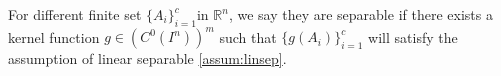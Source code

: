 
\begin{definition}[Separabel]
For different finite set $\{A_i\}_{i=1}^c$in $\mathbb{R}^n$, we say they are separable if there exists a kernel function $g \in (C^0({I^n}))^m$ such that $\{g(A_i)\}_{i=1}^c$ will satisfy the assumption of linear separable \ref{assum:linsep}.
\end{definition}

